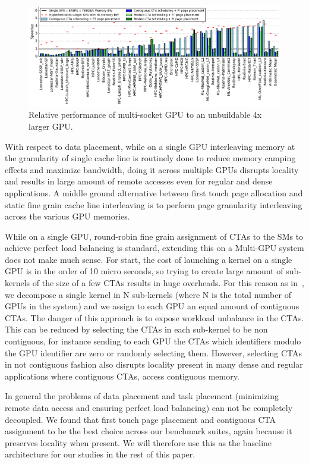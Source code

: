 \begin{figure}[tp]
    \centering
    \includegraphics[width=1\linewidth]{figures/plot_different_baselines.pdf}
    \caption{Relative performance of multi-socket GPU to an unbuildable 4x larger GPU.}
    \label{fig:motivation2}
\end{figure}

With respect to data placement, while on a single GPU interleaving memory at 
the granularity of single cache line is routinely done to reduce memory 
camping effects and maximize bandwidth, doing it across multiple GPUs 
disrupts locality and results in large amount of remote accesses even for 
regular and dense applications. A middle ground alternative between first 
touch page allocation and static fine grain cache line interleaving is to 
perform page granularity interleaving across the various GPU memories.

While on a single GPU, round-robin fine grain assignment of CTAs to the SMs 
to achieve perfect load balancing is standard, extending this on a Multi-GPU 
system does not make much sense. For start, the cost of launching a kernel on 
a single GPU is in the order of 10 micro seconds, so trying to create large 
amount of sub-kernels of the size of a few CTAs results in huge overheads. 
For this reason as in~\cite{Cabezas2015}, we decompose a single kernel in N 
sub-kernels (where N is the total number of GPUs in the system) and we assign 
to each GPU an equal amount of contiguous CTAs. The danger of this approach 
is to expose workload unbalance in the CTAs. This can be reduced by selecting 
the CTAs in each sub-kernel to be non contiguous, for instance sending to 
each GPU the CTAs which identifiers modulo the GPU identifier are zero or 
randomly selecting them. However, selecting CTAs in not contiguous fashion
also disrupts locality present in many dense and regular applications where 
contiguous CTAs, access contiguous memory.

In general the problems of data placement and task placement (minimizing 
remote data access and ensuring perfect load balancing) can not be completely 
decoupled. We found that first touch page placement and contiguous CTA 
assignment to be the best choice across our benchmark suites, again because it 
preserves locality when present. We will therefore use this as the baseline 
architecture for our studies in the rest of this paper.


